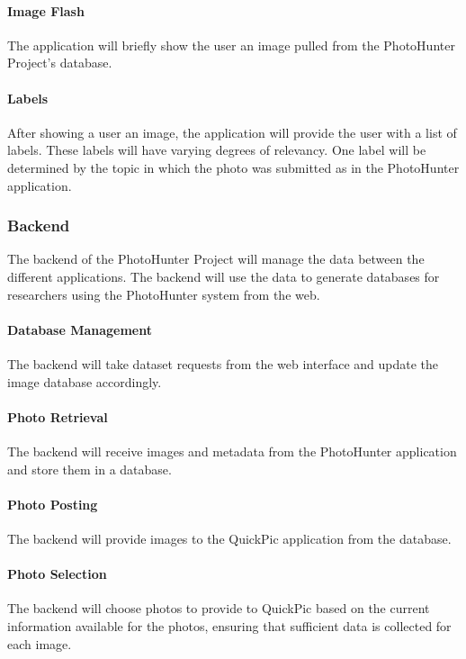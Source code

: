 \documentclass{article}
\begin{document}
  \paragraph{Image Flash}
  The application will briefly show the user an image pulled from the
  PhotoHunter Project's database.

  \paragraph{Labels}
  After showing a user an image, the application will provide the user with a
  list of labels. These labels will have varying degrees of relevancy. One label
  will be determined by the topic in which the photo was submitted as in the
  PhotoHunter application.

\subsubsection{Backend}
The backend of the PhotoHunter Project will manage the data between the different
applications. The backend will use the data to generate databases for researchers
using the PhotoHunter system from the web.

  \paragraph{Database Management}
  The backend will take dataset requests from the web interface and update the
  image database accordingly.

  \paragraph{Photo Retrieval}
  The backend will receive images and metadata from the PhotoHunter application
  and store them in a database.

  \paragraph{Photo Posting}
  The backend will provide images to the QuickPic application from the database.

  \paragraph{Photo Selection}
  The backend will choose photos to provide to QuickPic based on the current
  information available for the photos, ensuring that sufficient data is collected
  for each image.
\end{document}
